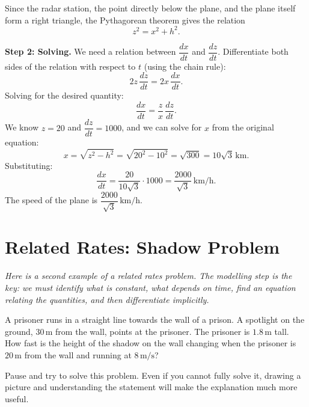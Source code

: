 Since the radar station, the point directly below the plane, and the plane itself form a right triangle, the Pythagorean theorem gives the relation
\[
  z^{2} = x^{2} + h^{2}.
\]

\textbf{Step 2: Solving.}  We need a relation between $\dfrac{dx}{dt}$ and $\dfrac{dz}{dt}$.  Differentiate both sides of the relation with respect to $t$ (using the chain rule):
\[
  2z\,\frac{dz}{dt} = 2x\,\frac{dx}{dt}.
\]
Solving for the desired quantity:
\[
  \frac{dx}{dt} = \frac{z}{x}\,\frac{dz}{dt}.
\]
We know $z = 20$ and $\dfrac{dz}{dt} = 1000$, and we can solve for $x$ from the original equation:
\[
  x = \sqrt{z^{2} - h^{2}} = \sqrt{20^{2} - 10^{2}} = \sqrt{300} = 10\sqrt{3}\,\text{km}.
\]
Substituting:
\[
  \frac{dx}{dt} = \frac{20}{10\sqrt{3}}\cdot 1000 = \frac{2000}{\sqrt{3}}\,\text{km/h}.
\]
The speed of the plane is $\dfrac{2000}{\sqrt{3}}\,\text{km/h}$.

\section{Related Rates: Shadow Problem}
\label{sec:6.2}

\textit{Here is a second example of a related rates problem.  The modelling step is the key: we must identify what is constant, what depends on time, find an equation relating the quantities, and then differentiate implicitly.}

\begin{example}
\label{ex:6-2}
A prisoner runs in a straight line towards the wall of a prison.  A spotlight on the ground, $30\,\text{m}$ from the wall, points at the prisoner.  The prisoner is $1.8\,\text{m}$ tall.  How fast is the height of the shadow on the wall changing when the prisoner is $20\,\text{m}$ from the wall and running at $8\,\text{m/s}$?
\end{example}

\begin{remark}
Pause and try to solve this problem.  Even if you cannot fully solve it, drawing a picture and understanding the statement will make the explanation much more useful.
\end{remark}

